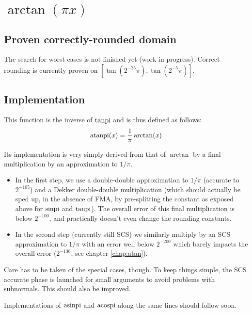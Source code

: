 \section{ $\arctan(\pi x)$}

\subsection{Proven correctly-rounded domain}

The search for worst cases is not finished yet (work in progress).
Correct rounding is currently proven on $[\tan(2^{-25}\pi),
\tan(2^{-5}\pi)]$.

\subsection{Implementation}
This function is the inverse of $\operatorname{tanpi}$ and is thus defined as follows:
$$\operatorname{atanpi}(x) = \frac{1}{\pi}\arctan(x)$$

Its implementation is very simply derived from that of $\arctan$ by a
final multiplication by an approximation to $1/\pi$. 

\begin{itemize}
\item In the first step, we use a double-double approximation to
  $1/\pi$ (accurate to $2^{-105}$) and a Dekker double-double
  multiplication (which should actually be sped up, in the absence of
  FMA, by pre-splitting the constant as exposed above for $\operatorname{sinpi}$ and
  $\operatorname{tanpi}$).  The overall error of this final multiplication is below
  $2^{-100}$, and practically doesn't even change the rounding
  constants.

\item In the second step (currently still SCS) we similarly multiply 
  by an SCS approximation to $1/\pi$ with an  error well below $2^{-200}$
  which barely impacts the  overall error ($2^{-136}$, 
  see chapter \ref{chap:atan}).
\end{itemize}

Care has to be taken of the special cases, though. To keep things
simple, the SCS accurate phase is launched for small arguments to
avoid problems with subnormals. This should also be improved.



Implementations of $\operatorname{asinpi}$ and $\operatorname{acospi}$ along the same lines should
follow soon.
